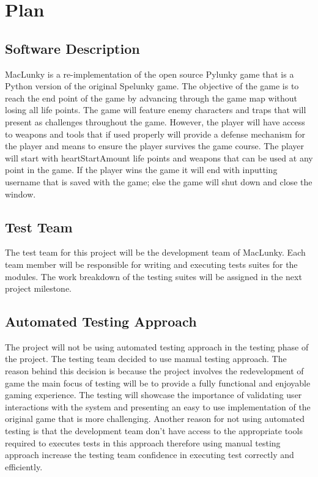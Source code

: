 \documentclass[12pt, titlepage]{article}
\begin{document}
\section{Plan}
	
\subsection{Software Description}

MacLunky is a re-implementation of the open source Pylunky game that is a Python version of the original Spelunky game. The objective of the game is to reach the end point of the game by advancing through the game map without losing all life points. The game will feature enemy characters and traps that will present as challenges throughout the game. However, the player will have access to weapons and tools that if used properly will provide a defense mechanism for the player and means to ensure the player survives the game course. The player will start with heartStartAmount life points and weapons that can be used at any point in the game. If the player wins the game it will end with inputting username that is saved with the game; else the game will shut down and close the window.

\subsection{Test Team}

The test team for this project will be the development team of MacLunky. Each team member will be responsible for writing and executing tests suites for the modules. The work breakdown of the testing suites will be assigned in the next project milestone.

\subsection{Automated Testing Approach}

The project will not be using automated testing approach in the testing phase of the project. The testing team decided to use manual testing approach. The reason behind this decision is because the project involves the redevelopment of game the main focus of testing will be to provide a fully functional and enjoyable gaming experience. The testing will showcase the importance of validating user interactions with the system and presenting an easy to use implementation of the original game that is more challenging. Another reason for not using automated testing is that the development team don't have access to the appropriate tools required to executes tests in this approach therefore using manual testing approach increase the testing team confidence in executing test correctly and efficiently. 
\end{document}
